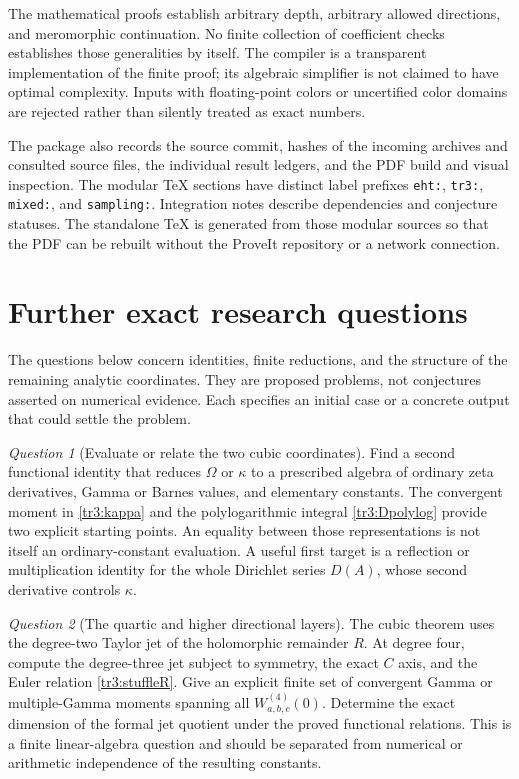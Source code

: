 \documentclass[11pt]{article}
\numberwithin{equation}{section}
\theoremstyle{plain}
\theoremstyle{definition}
\theoremstyle{remark}
\newtheorem{question}{Question}
\newcommand{\src}[1]{\nolinkurl{#1}}
\begin{document}
The mathematical proofs establish arbitrary depth, arbitrary allowed
directions, and meromorphic continuation. No finite collection of
coefficient checks establishes those generalities by itself. The
compiler is a transparent implementation of the finite proof;
its algebraic simplifier is not claimed to have optimal complexity.
Inputs with floating-point colors or uncertified color domains are
rejected rather than silently treated as exact numbers.

The package also records the source commit, hashes of the incoming
archives and consulted source files, the individual result ledgers,
and the PDF build and visual inspection. The modular TeX sections
have distinct label prefixes \src{eht:}, \src{tr3:}, \src{mixed:},
and \src{sampling:}. Integration notes describe dependencies and
conjecture statuses. The standalone TeX is generated from those
modular sources so that the PDF can be rebuilt without the ProveIt
repository or a network connection.



\section{Further exact research questions}
\label{research:section}

The questions below concern identities, finite reductions, and the
structure of the remaining analytic coordinates. They are proposed
problems, not conjectures asserted on numerical evidence. Each specifies
an initial case or a concrete output that could settle the problem.

\begin{question}[Evaluate or relate the two cubic coordinates]
Find a second functional identity that reduces $\Omega$ or $\kappa$
to a prescribed algebra of ordinary zeta derivatives, Gamma or Barnes
values, and elementary constants. The convergent moment in
\eqref{tr3:kappa} and the polylogarithmic integral
\eqref{tr3:Dpolylog} provide two explicit starting points. An equality
between those representations is not itself an ordinary-constant
evaluation. A useful first target is a reflection or multiplication
identity for the whole Dirichlet series $D(A)$, whose second derivative
controls $\kappa$.
\end{question}

\begin{question}[The quartic and higher directional layers]
The cubic theorem uses the degree-two Taylor jet of the holomorphic
remainder $R$. At degree four, compute the degree-three jet subject
to symmetry, the exact $C$ axis, and the Euler relation
\eqref{tr3:stuffleR}. Give an explicit finite set of convergent Gamma
or multiple-Gamma moments spanning all $W^{(4)}_{a,b,c}(0)$.
Determine the exact dimension of the formal jet quotient under the
proved functional relations. This is a finite linear-algebra question
and should be separated from numerical or arithmetic independence
of the resulting constants.
\end{question}
\end{document}
